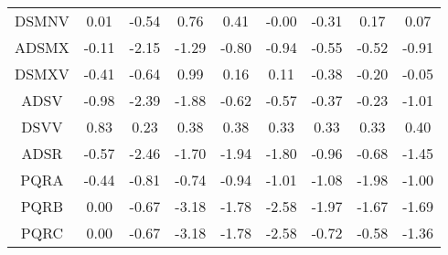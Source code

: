 \begin{longtable}{ | c || c | c | c | c | c | c | c || c |}
DSMNV &  \cellcolor[HTML]{FFFFFF} 0.01 &  \cellcolor[HTML]{FFEFEF} -0.54 &  \cellcolor[HTML]{EFEFFF} 0.76 &  \cellcolor[HTML]{F7F7FF} 0.41 &  \cellcolor[HTML]{FFFFFF} -0.00 &  \cellcolor[HTML]{FFF7F7} -0.31 &  \cellcolor[HTML]{F7F7FF} 0.17 &  \cellcolor[HTML]{FFFFFF} 0.07 \\
ADSMX &  \cellcolor[HTML]{FFFFFF} -0.11 &  \cellcolor[HTML]{FFC7C7} -2.15 &  \cellcolor[HTML]{FFDFDF} -1.29 &  \cellcolor[HTML]{FFE7E7} -0.80 &  \cellcolor[HTML]{FFE7E7} -0.94 &  \cellcolor[HTML]{FFEFEF} -0.55 &  \cellcolor[HTML]{FFEFEF} -0.52 &  \cellcolor[HTML]{FFE7E7} -0.91 \\
DSMXV &  \cellcolor[HTML]{FFF7F7} -0.41 &  \cellcolor[HTML]{FFEFEF} -0.64 &  \cellcolor[HTML]{E7E7FF} 0.99 &  \cellcolor[HTML]{F7F7FF} 0.16 &  \cellcolor[HTML]{FFFFFF} 0.11 &  \cellcolor[HTML]{FFF7F7} -0.38 &  \cellcolor[HTML]{FFF7F7} -0.20 &  \cellcolor[HTML]{FFFFFF} -0.05 \\
ADSV &  \cellcolor[HTML]{FFE7E7} -0.98 &  \cellcolor[HTML]{FFBFBF} -2.39 &  \cellcolor[HTML]{FFCFCF} -1.88 &  \cellcolor[HTML]{FFEFEF} -0.62 &  \cellcolor[HTML]{FFEFEF} -0.57 &  \cellcolor[HTML]{FFF7F7} -0.37 &  \cellcolor[HTML]{FFF7F7} -0.23 &  \cellcolor[HTML]{FFE7E7} -1.01 \\
DSVV &  \cellcolor[HTML]{E7E7FF} 0.83 &  \cellcolor[HTML]{F7F7FF} 0.23 &  \cellcolor[HTML]{F7F7FF} 0.38 &  \cellcolor[HTML]{F7F7FF} 0.38 &  \cellcolor[HTML]{F7F7FF} 0.33 &  \cellcolor[HTML]{F7F7FF} 0.33 &  \cellcolor[HTML]{F7F7FF} 0.33 &  \cellcolor[HTML]{F7F7FF} 0.40 \\
ADSR &  \cellcolor[HTML]{FFEFEF} -0.57 &  \cellcolor[HTML]{FFBFBF} -2.46 &  \cellcolor[HTML]{FFD7D7} -1.70 &  \cellcolor[HTML]{FFCFCF} -1.94 &  \cellcolor[HTML]{FFCFCF} -1.80 &  \cellcolor[HTML]{FFE7E7} -0.96 &  \cellcolor[HTML]{FFEFEF} -0.68 &  \cellcolor[HTML]{FFD7D7} -1.45 \\
PQRA &  \cellcolor[HTML]{FFF7F7} -0.44 &  \cellcolor[HTML]{FFE7E7} -0.81 &  \cellcolor[HTML]{FFEFEF} -0.74 &  \cellcolor[HTML]{FFE7E7} -0.94 &  \cellcolor[HTML]{FFE7E7} -1.01 &  \cellcolor[HTML]{FFE7E7} -1.08 &  \cellcolor[HTML]{FFCFCF} -1.98 &  \cellcolor[HTML]{FFE7E7} -1.00 \\
PQRB &  \cellcolor[HTML]{FFFFFF} 0.00 &  \cellcolor[HTML]{FFEFEF} -0.67 &  \cellcolor[HTML]{FFAFAF} -3.18 &  \cellcolor[HTML]{FFCFCF} -1.78 &  \cellcolor[HTML]{FFBFBF} -2.58 &  \cellcolor[HTML]{FFCFCF} -1.97 &  \cellcolor[HTML]{FFD7D7} -1.67 &  \cellcolor[HTML]{FFD7D7} -1.69 \\
PQRC &  \cellcolor[HTML]{FFFFFF} 0.00 &  \cellcolor[HTML]{FFEFEF} -0.67 &  \cellcolor[HTML]{FFAFAF} -3.18 &  \cellcolor[HTML]{FFCFCF} -1.78 &  \cellcolor[HTML]{FFBFBF} -2.58 &  \cellcolor[HTML]{FFEFEF} -0.72 &  \cellcolor[HTML]{FFEFEF} -0.58 &  \cellcolor[HTML]{FFDFDF} -1.36 \\

\end{longtable}
